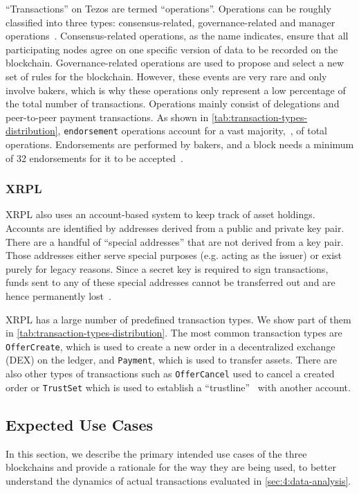 ``Transactions'' on Tezos are termed  ``operations''.
Operations can be roughly classified into three types: consensus-related, governance-related and manager operations~\cite{AmitPanghal2019}.
Consensus-related operations, as the name indicates, ensure that all participating nodes agree on one specific version of data to be recorded on the blockchain.
Governance-related operations are used to propose and select a new set of rules for the blockchain.
However, these events are very rare and only involve bakers, which is why these operations only represent a low percentage of the total number of transactions.
Operations mainly consist of delegations and peer-to-peer payment transactions.
As shown in \autoref{tab:transaction-types-distribution}, \texttt{endorsement} operations account for a vast majority,~, of total operations.
Endorsements are performed by bakers, and a block needs a minimum of 32 endorsements for it to be accepted~\cite{NomadicLabs2018b}.



\subsubsection{XRPL}
XRPL also uses an account-based system to keep track of asset holdings.
Accounts are identified by addresses derived from a public and private key pair.
There are a handful of ``special addresses'' that are not derived from a key pair.
Those addresses either serve special purposes (e.g. acting as the  issuer) or exist purely for legacy reasons.
Since a secret key is required to sign transactions, funds sent to any of these special addresses cannot be transferred out and are hence permanently lost~\cite{XRPLedger2019}.

XRPL has a large number of predefined transaction types.
We show part of them in \autoref{tab:transaction-types-distribution}.
The most common transaction types are \texttt{OfferCreate}, which is used to create a new order in a decentralized exchange (DEX) on the ledger, and \texttt{Payment}, which is used to transfer assets.
There are also other types of transactions such as \texttt{OfferCancel} used to cancel a created order or \texttt{TrustSet} which is used to establish a ``trustline''~\cite{xrp_ledger_overview} with another account.

\subsection{Expected Use Cases}
\label{sec:usecase}
In this section, we describe the primary intended use cases of the three blockchains and provide a rationale for the way they are being used, to better understand the dynamics of actual transactions evaluated in \autoref{sec:4:data-analysis}.

